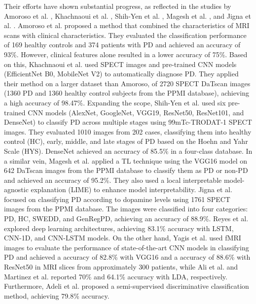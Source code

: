 \documentclass{article}
\begin{document}
Their efforts have shown substantial progress, as reflected in the studies by Amoroso et al. \cite{amoroso2018complex}, Khachnaoui et al. \cite{khachnaoui2023enhanced}, Shih-Yen et al. \cite{hsu2020classification}, Magesh et al. \cite{magesh2020explainable}, and Jigna et al. \cite{hathaliya2022convolutional}. Amoroso et al. \cite{amoroso2018complex} proposed a method that combined the characteristics of MRI scans with clinical characteristics. They evaluated the classification performance of 169 healthy controls and 374 patients with PD and achieved an accuracy of 93\%. However, clinical features alone resulted in a lower accuracy of 75\%. Based on this, Khachnaoui et al. \cite{khachnaoui2023enhanced} used SPECT images and pre-trained CNN models (EfficientNet B0, MobileNet V2) to automatically diagnose PD. They applied their method on a larger dataset than Amoroso, of 2720 SPECT DaTscan images (1360 PD and 1360 healthy control subjects from the PPMI database), achieving a high accuracy of 98.47\%. Expanding the scope, Shih-Yen et al. \cite{hsu2020classification} used six pre-trained CNN models (AlexNet, GoogleNet, VGG19, ResNet50, ResNet101, and DenseNet) to classify PD across multiple stages using 99mTc-TRODAT-1 SPECT images. They evaluated 1010 images from 202 cases, classifying them into healthy control (HC), early, middle, and late stages of PD based on the Hoehn and Yahr Scale (HYS). DenseNet achieved an accuracy of 85.5\% in a four-class database. In a similar vein, Magesh et al. \cite{magesh2020explainable} applied a TL technique using the VGG16 model on 642 DaTscan images from the PPMI database to classify them as PD or non-PD and achieved an accuracy of 95.2\%. They also used a local interpretable model-agnostic explanation (LIME) to enhance model interpretability. Jigna et al. \cite{hathaliya2022convolutional} focused on classifying PD according to dopamine levels using 1761 SPECT images from the PPMI database. The images were classified into four categories: PD, HC, SWEDD, and GenRegPD, achieving an accuracy of 88.9\%. Reyes et al. \cite{reyes2019lstm} explored deep learning architectures, achieving 83.1\% accuracy with LSTM, CNN-1D, and CNN-LSTM models. On the other hand, Yagis et al. \cite{DBLP:conf/bibm/YagisHC19} used fMRI images to evaluate the performance of state-of-the-art CNN models in classifying PD and achieved a accuracy of 82.8\% with VGG16 and a accuracy of 88.6\% with ResNet50 in MRI slices from approximately 300 patients, while Ali et al. \cite{ali2019multi} and Martinez et al. \cite{martinez2018kinematic} reported 70\% and 64.1\% accuracy with LDA, respectively. Furthermore, Adeli et al. \cite{adeli2018semi} proposed a semi-supervised discriminative classification method, achieving 79.8\% accuracy. 
\end{document}
